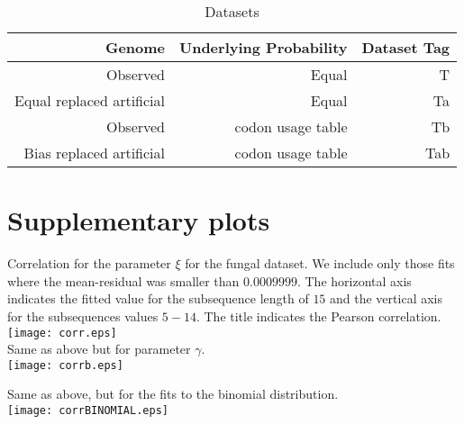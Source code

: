 \documentclass[a4paper,10pt]{paper}%
\begin{document}
%
\begin{table}[h]
\caption{Datasets}
\label{File Type}
\centering
\begin{tabular}{r | r | r}
\hline
\hline
Genome & Underlying Probability & Dataset Tag\\
\hline
Observed & Equal & T\\
Equal replaced artificial & Equal & Ta\\
Observed & codon usage table & Tb \\
Bias replaced artificial & codon usage table  & Tab\\
\hline
\end{tabular}
\end{table}
%
%

\pagebreak
\section{Supplementary plots}
Correlation for the parameter $\xi$ for the fungal dataset. We include only those fits where the mean-residual was smaller than $0.0009999$. The horizontal axis indicates the fitted value for the subsequence length of $15$ and the vertical axis for the subsequences values $5-14$. The title indicates the Pearson correlation.\\
\texttt{[image: corr.eps]}
\\
Same as above but for parameter $\gamma$.
\\
\texttt{[image: corrb.eps]}
\\
\pagebreak

Same as above, but for the fits to the binomial distribution. 
\\
\texttt{[image: corrBINOMIAL.eps]}
\\
\end{document}
